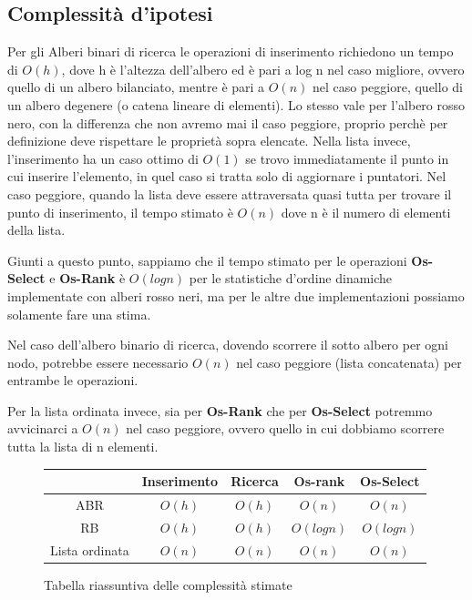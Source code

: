 \subsection{Complessità d'ipotesi}
Per gli Alberi binari di ricerca le operazioni di inserimento richiedono un tempo di $O(h)$, dove h è l'altezza dell'albero ed è pari a log n nel caso migliore, ovvero quello di un albero bilanciato, mentre è pari a $O(n)$ nel caso peggiore, quello di un albero degenere (o catena lineare di elementi).
Lo stesso vale per l'albero rosso nero, con la differenza che non avremo mai il caso peggiore, proprio perchè per definizione deve rispettare le proprietà sopra elencate.
Nella lista invece, l'inserimento ha un caso ottimo di $O(1)$ se trovo immediatamente il punto in cui inserire l'elemento, in quel caso si tratta solo di aggiornare i puntatori. Nel caso peggiore, quando la lista deve essere attraversata quasi tutta per trovare il punto di inserimento, il tempo stimato è $O(n)$ dove n è il numero di elementi della lista.

Giunti a questo punto, sappiamo che il tempo stimato per le operazioni \textbf{Os-Select} e \textbf{Os-Rank} è $O(log n)$ per le statistiche d'ordine dinamiche implementate con alberi rosso neri, ma per le altre due implementazioni possiamo solamente fare una stima.

Nel caso dell'albero binario di ricerca, dovendo scorrere il sotto albero per ogni nodo, potrebbe essere necessario $O(n)$ nel caso peggiore (lista concatenata) per entrambe le operazioni.

Per la lista ordinata invece, sia per \textbf{Os-Rank} che per \textbf{Os-Select} potremmo avvicinarci a $O(n)$ nel caso peggiore, ovvero quello in cui dobbiamo scorrere tutta la lista di n elementi.

\begin{figure}[h]
    \centering
    \begin{tabular}{|c|c|c|c|c|}
        \hline
         & Inserimento & Ricerca & Os-rank & Os-Select\\
        \hline
        ABR & $O(h)$ & $O(h)$ & $O(n)$ & $O(n)$\\
        \hline
        RB & $O(h)$ & $O(h)$ & $O(log n)$ & $O(log n)$\\
        \hline
        Lista ordinata & $O(n)$ & $O(n)$ & $O(n)$ & $O(n)$\\
        \hline
    \end{tabular}
    \caption{Tabella riassuntiva delle complessità stimate}
\end{figure}



